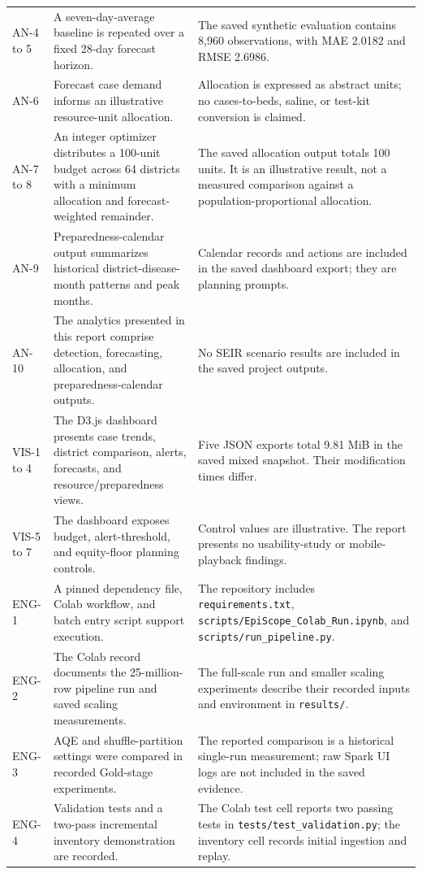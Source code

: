 \documentclass[conference]{IEEEtran}
\begin{document}
\begin{longtable}{p{1.7cm}p{5.6cm}p{8.3cm}}
AN-4 to 5 & A seven-day-average baseline is repeated over a fixed 28-day forecast horizon. & The saved synthetic evaluation contains 8,960 observations, with MAE 2.0182 and RMSE 2.6986. \\
AN-6 & Forecast case demand informs an illustrative resource-unit allocation. & Allocation is expressed as abstract units; no cases-to-beds, saline, or test-kit conversion is claimed. \\
AN-7 to 8 & An integer optimizer distributes a 100-unit budget across 64 districts with a minimum allocation and forecast-weighted remainder. & The saved allocation output totals 100 units. It is an illustrative result, not a measured comparison against a population-proportional allocation. \\
AN-9 & Preparedness-calendar output summarizes historical district-disease-month patterns and peak months. & Calendar records and actions are included in the saved dashboard export; they are planning prompts. \\
AN-10 & The analytics presented in this report comprise detection, forecasting, allocation, and preparedness-calendar outputs. & No SEIR scenario results are included in the saved project outputs. \\
VIS-1 to 4 & The D3.js dashboard presents case trends, district comparison, alerts, forecasts, and resource/preparedness views. & Five JSON exports total 9.81 MiB in the saved mixed snapshot. Their modification times differ. \\
VIS-5 to 7 & The dashboard exposes budget, alert-threshold, and equity-floor planning controls. & Control values are illustrative. The report presents no usability-study or mobile-playback findings. \\
ENG-1 & A pinned dependency file, Colab workflow, and batch entry script support execution. & The repository includes \texttt{requirements.txt}, \texttt{scripts/EpiScope\_Colab\_Run.ipynb}, and \texttt{scripts/run\_pipeline.py}. \\
ENG-2 & The Colab record documents the 25-million-row pipeline run and saved scaling measurements. & The full-scale run and smaller scaling experiments describe their recorded inputs and environment in \texttt{results/}. \\
ENG-3 & AQE and shuffle-partition settings were compared in recorded Gold-stage experiments. & The reported comparison is a historical single-run measurement; raw Spark UI logs are not included in the saved evidence. \\
ENG-4 & Validation tests and a two-pass incremental inventory demonstration are recorded. & The Colab test cell reports two passing tests in \texttt{tests/test\_validation.py}; the inventory cell records initial ingestion and replay. \\
\bottomrule
\end{longtable}
\normalsize
\end{document}
